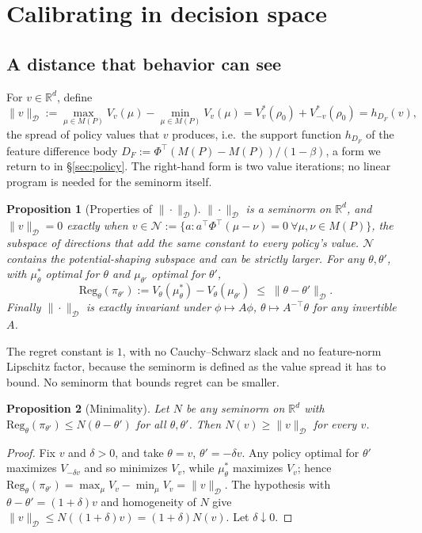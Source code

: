 \documentclass{article}
\newtheorem{proposition}{Proposition}
\newcommand{\Dnorm}[1]{\|#1\|_{\mathcal D}}
\begin{document}
\section{Calibrating in decision space}
\label{sec:method}

\subsection{A distance that behavior can see}
\label{sec:seminorm}

For $v\in\mathbb R^d$, define
\[
\Dnorm{v}:=\max_{\mu\in M(P)}V_v(\mu)-\min_{\mu\in M(P)}V_v(\mu)
= V^*_v(\rho_0)+V^*_{-v}(\rho_0)
= h_{D_F}(v),
\]
the spread of policy values that $v$ produces, i.e.\ the support function
$h_{D_F}$ of the feature difference body
$D_F:=\Phi^\top(M(P)-M(P))/(1-\beta)$, a form we return to in
\S\ref{sec:policy}. The right-hand form is two value iterations; no linear
program is needed for the seminorm itself.

\begin{proposition}[Properties of $\Dnorm{\cdot}$]
\label{prop:da-seminorm}
$\Dnorm{\cdot}$ is a seminorm on $\mathbb R^d$, and $\Dnorm{v}=0$ exactly when
$v\in\mathcal N:=\{a: a^\top\Phi^\top(\mu-\nu)=0\ \forall\mu,\nu\in M(P)\}$, the
subspace of directions that add the same constant to every policy's value.
$\mathcal N$ contains the potential-shaping subspace and can be strictly larger.
For any $\theta,\theta'$, with $\mu^*_\theta$ optimal for $\theta$ and
$\mu_{\theta'}$ optimal for $\theta'$,
\[
\mathrm{Reg}_\theta(\pi_{\theta'}):=V_\theta(\mu^*_\theta)-V_\theta(\mu_{\theta'})
\;\le\;\Dnorm{\theta-\theta'}.
\]
Finally $\Dnorm{\cdot}$ is exactly invariant under $\phi\mapsto A\phi$,
$\theta\mapsto A^{-\top}\theta$ for any invertible $A$.
\end{proposition}

The regret constant is $1$, with no Cauchy--Schwarz slack and no feature-norm
Lipschitz factor, because the seminorm is defined as the value spread it has to
bound. No seminorm that bounds regret can be smaller.

\begin{proposition}[Minimality]
\label{prop:minimal}
Let $N$ be any seminorm on $\mathbb R^d$ with
$\mathrm{Reg}_\theta(\pi_{\theta'})\le N(\theta-\theta')$ for all
$\theta,\theta'$. Then $N(v)\ge\Dnorm{v}$ for every $v$.
\end{proposition}

\begin{proof}
Fix $v$ and $\delta>0$, and take $\theta=v$, $\theta'=-\delta v$. Any policy
optimal for $\theta'$ maximizes $V_{-\delta v}$ and so minimizes $V_v$, while
$\mu^*_\theta$ maximizes $V_v$; hence
$\mathrm{Reg}_\theta(\pi_{\theta'})=\max_\mu V_v-\min_\mu V_v=\Dnorm{v}$. The
hypothesis with $\theta-\theta'=(1+\delta)v$ and homogeneity of $N$ give
$\Dnorm{v}\le N((1+\delta)v)=(1+\delta)N(v)$. Let $\delta\downarrow0$.
\end{proof}
\end{document}
